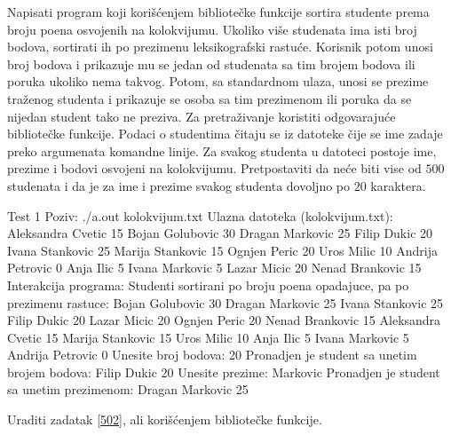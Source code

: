\begin{Answer}[ref=520]
\end{Answer}
\begin{Exercise}[label=521]
  Napisati program koji korišćenjem bibliotečke funkcije 
  sortira studente prema broju poena osvojenih na kolokvijumu. Ukoliko
  više studenata ima isti broj bodova, sortirati ih po prezimenu
  leksikografski rastuće. Korisnik potom unosi broj bodova i prikazuje
  mu se jedan od studenata sa tim brojem bodova ili poruka ukoliko
  nema takvog. Potom, sa standardnom ulaza, unosi se prezime traženog
  studenta i prikazuje se osoba sa tim prezimenom ili poruka da se
  nijedan student tako ne preziva. Za pretraživanje koristiti
  odgovarajuće bibliotečke funkcije. Podaci o studentima čitaju se iz
  datoteke čije se ime zadaje preko argumenata komandne linije. Za
  svakog studenta u datoteci postoje ime, prezime i bodovi osvojeni na
  kolokvijumu. Pretpostaviti da neće biti vise od $500$ studenata i
  da je za ime i prezime svakog studenta dovoljno po $20$ karaktera.
  
\begin{maxitest}
\begin{test}{Test 1}
Poziv:  ./a.out kolokvijum.txt
Ulazna datoteka (kolokvijum.txt):
  Aleksandra Cvetic 15
  Bojan Golubovic 30
  Dragan Markovic 25
  Filip Dukic 20 
  Ivana Stankovic 25
  Marija Stankovic 15 
  Ognjen Peric 20
  Uros Milic 10
  Andrija Petrovic 0
  Anja Ilic 5
  Ivana Markovic 5
  Lazar Micic 20
  Nenad Brankovic 15
Interakcija programa:
  Studenti sortirani po broju poena opadajuce, pa po prezimenu rastuce:
  Bojan Golubovic  30
  Dragan Markovic  25
  Ivana Stankovic  25
  Filip Dukic  20
  Lazar Micic  20
  Ognjen Peric  20
  Nenad Brankovic  15
  Aleksandra Cvetic  15
  Marija Stankovic  15
  Uros Milic  10
  Anja Ilic  5
  Ivana Markovic  5
  Andrija Petrovic  0
  Unesite broj bodova: 20
  Pronadjen je student sa unetim  brojem bodova: Filip Dukic 20
  Unesite prezime: Markovic
  Pronadjen je student sa unetim prezimenom: Dragan Markovic 25
\end{test}
\end{maxitest}
  
\end{Exercise}

\begin{Answer}[ref=521]
\end{Answer}
\begin{Exercise}[label=522]
  Uraditi zadatak \ref{502}, ali korišćenjem bibliotečke 
  funkcije.
  
\end{Exercise}

